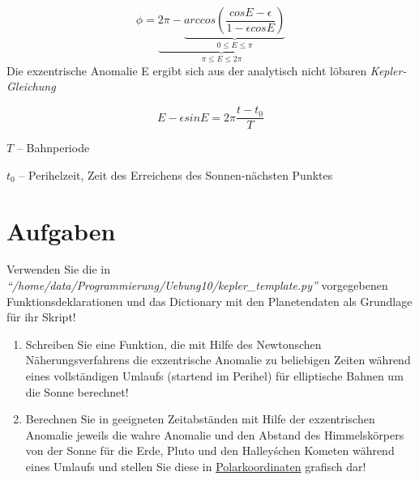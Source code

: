 \documentclass{scrartcl}	    %
\begin{document}
\[
\phi = \underbrace{2\pi - \underbrace{arccos(\frac{cos E-\epsilon}{1-\epsilon cos E})}_{0 \le E \le \pi}}_{\pi \le E \le 2\pi}
\]
Die exzentrische Anomalie E ergibt sich aus der analytisch nicht löbaren \emph{Kepler-Gleichung}

\[
E - \epsilon sin E = 2 \pi \frac{t - t_0}{T}
\]
\begin{description}
\item $T$ -- Bahnperiode
\item $t_0$ -- Perihelzeit, Zeit des Erreichens des Sonnen-nächsten Punktes
\end{description}

\section*{Aufgaben}
Verwenden Sie die in \emph{"`/home/data/Programmierung/Uebung10/kepler\_template.py"'} 
vorgegebenen Funktionsdeklarationen und das Dictionary mit den Planetendaten als Grundlage für ihr Skript!

\begin{enumerate}
\item Schreiben Sie eine Funktion, die mit Hilfe des Newtonschen Näherungsverfahrens die exzentrische Anomalie zu beliebigen Zeiten während eines vollständigen Umlaufs (startend im Perihel) für elliptische Bahnen um die Sonne berechnet!
\item Berechnen Sie in geeigneten Zeitabständen mit Hilfe der exzentrischen Anomalie jeweils die wahre Anomalie und den Abstand des Himmelskörpers von der Sonne für die Erde, Pluto und den Halley\'schen Kometen während eines Umlaufs und stellen Sie diese in \href{http://matplotlib.org/api/pyplot_api.html#matplotlib.pyplot.polar}{Polarkoordinaten} grafisch dar! %



\end{enumerate}
\end{document}
